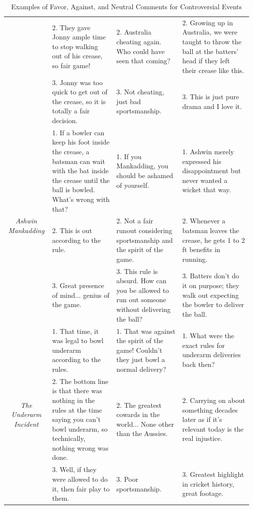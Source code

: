 \documentclass{article}
\begin{document}
\begin{table}[htbp]
{\begin{tabular}{|c|p{4cm}|p{4cm}|p{4cm}|}
            & 2. They gave Jonny ample time to stop walking out of his crease, so fair game! & 2. Australia cheating again. Who could have seen that coming? & 2. Growing up in Australia, we were taught to throw the ball at the batters' head if they left their crease like this. \\
            & 3. Jonny was too quick to get out of the crease, so it is totally a fair decision. & 3. Not cheating, just bad sportsmanship. & 3. This is just pure drama and I love it. \\
            \hline
            \multirow{3}{*}{\textit{Ashwin Mankadding}} 
            & 1. If a bowler can keep his foot inside the crease, a batsman can wait with the bat inside the crease until the ball is bowled. What's wrong with that? & 1. If you Mankadding, you should be ashamed of yourself. & 1. Ashwin merely expressed his disappointment but never wanted a wicket that way. \\
            & 2. This is out according to the rule. & 2. Not a fair runout considering sportsmanship and the spirit of the game. & 2. Whenever a batsman leaves the crease, he gets 1 to 2 ft benefits in running. \\
            & 3. Great presence of mind... genius of the game. & 3. This rule is absurd. How can you be allowed to run out someone without delivering the ball? & 3. Batters don’t do it on purpose; they walk out expecting the bowler to deliver the ball. \\
            \hline
            \multirow{3}{*}{\textit{The Underarm Incident}} 
            & 1. That time, it was legal to bowl underarm according to the rules. & 1. That was against the spirit of the game! Couldn't they just bowl a normal delivery? & 1. What were the exact rules for underarm deliveries back then? \\
            & 2. The bottom line is that there was nothing in the rules at the time saying you can't bowl underarm, so technically, nothing wrong was done. & 2. The greatest cowards in the world... None other than the Aussies. & 2. Carrying on about something decades later as if it's relevant today is the real injustice. \\
            & 3. Well, if they were allowed to do it, then fair play to them. & 3. Poor sportsmanship. & 3. Greatest highlight in cricket history, great footage. \\
            \hline
        \end{tabular}%
    }
    \caption{Examples of Favor, Against, and Neutral Comments for Controversial Events}
    \label{tab:event_comments}
\end{table}
\end{document}
